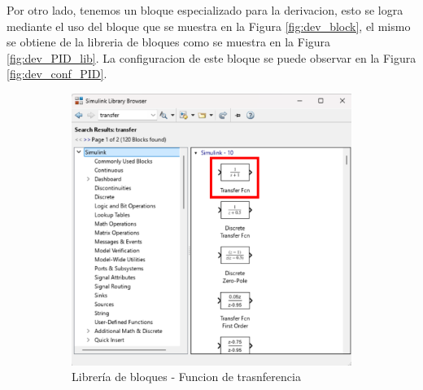 Por otro lado, tenemos un bloque especializado para la derivacion, esto se logra mediante el uso del bloque que se muestra en la Figura \ref{fig:dev_block}, el mismo se obtiene de la libreria de bloques como se muestra en la Figura \ref{fig:dev_PID_lib}. La configuracion de este bloque se puede observar en la Figura \ref{fig:dev_conf_PID}. 

\begin{figure}[htbp]
    \centering
    \begin{subfigure}[b]{0.35\textwidth}
        \centering
        \includegraphics[width=\textwidth]{fig/Capitulo5/Caso_de_estudio_PID/Transfer_func.pdf}
        \caption{Librería de bloques - Funcion de trasnferencia}
        \label{fig:tf_func_lib}
    \end{subfigure}
    \hfill
    \begin{subfigure}[b]{0.45\textwidth}
        \centering

\end{subfigure}
\end{figure}
